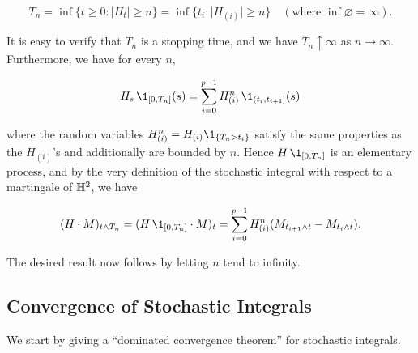 \documentclass[../Main.tex]{subfiles}
\begin{document}
$$T_n = \inf\{t \ge 0 : \vert{}H_t\vert{} \ge n\} = \inf\{t_i : \vert{}H_{(i)}\vert{} \ge n\} \quad (\text{where } \inf \varnothing = \infty).$$

It is easy to verify that $T_n$ is a stopping time, and we have $T_n \uparrow \infty$ as $n \to \infty$. Furthermore, we have for every $n$,

$$H_s \, \1_{[0, T_n]}(s) = \sum_{i=0}^{p-1} H_{(i)}^n \, \1_{(t_i, t_{i+1}]}(s)$$

where the random variables $H_{(i)}^n = H_{(i)} \1_{\{T_n > t_i\}}$ satisfy the same properties as the $H_{(i)}$'s and additionally are bounded by $n$. Hence $H \, \1_{[0, T_n]}$ is an elementary process, and by the very definition of the stochastic integral with respect to a martingale of $\mathbb{H}^2$, we have

$$(H \cdot M)_{t \land T_n} = (H \, \1_{[0, T_n]} \cdot M)_t = \sum_{i=0}^{p-1} H_{(i)}^n (M_{t_{i+1} \land t} - M_{t_i \land t}).$$

The desired result now follows by letting $n$ tend to infinity.

\subsection{Convergence of Stochastic Integrals}
We start by giving a ``dominated convergence theorem'' for stochastic integrals.
\end{document}

